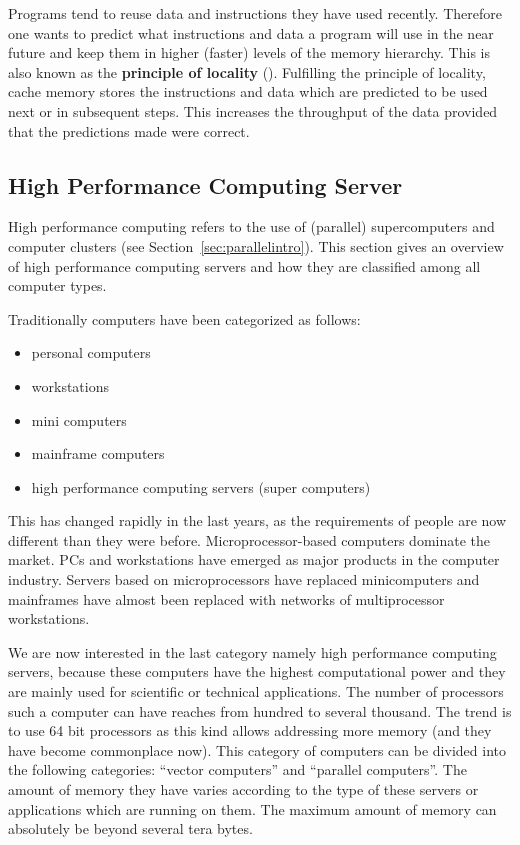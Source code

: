 Programs tend to reuse data and instructions they have used
recently. Therefore one wants to predict what instructions and data a
program will use in the near future and keep them in higher (faster)
levels of the memory hierarchy. This is also known as the
\textbf{principle of locality} (\cite{C1quant07}). Fulfilling the
principle of locality, cache memory stores the 
instructions and data which are predicted to be used next or in
subsequent steps. This increases the throughput of the data provided that
the predictions made were correct.

\subsection{High Performance Computing Server}
\label{sec:hpcserver}

High performance computing refers to the use of (parallel)
supercomputers and computer clusters (see
Section~\ref{sec:parallelintro}). This section gives an overview of
high performance computing servers and how they are classified
among all computer types.


Traditionally computers have been categorized as follows:
\begin{itemize}
\item personal computers
\item workstations
\item mini computers
\item mainframe computers
\item high performance computing servers (super computers)
\end{itemize}

This has changed rapidly in the last years, as the requirements of
people are now different than they were before. Microprocessor-based
computers dominate the market. PCs and workstations have emerged as
major products in the computer industry. Servers based on
microprocessors have replaced minicomputers and mainframes have almost
been replaced with networks of multiprocessor workstations.

We are now interested in the last category namely high performance
computing servers, because these computers have the highest
computational power and they are mainly used
for scientific or technical applications. The number of processors
such a computer can have reaches from hundred to several thousand. The
trend is to use 64 bit processors as this kind allows addressing more
memory (and they have become commonplace now). 
This category of computers can be divided into the following
categories: ``vector computers'' and ``parallel computers''.
The amount of memory they have varies according to the type of
these servers or applications which are running on them. The maximum
amount of memory can absolutely be beyond several tera bytes.  

